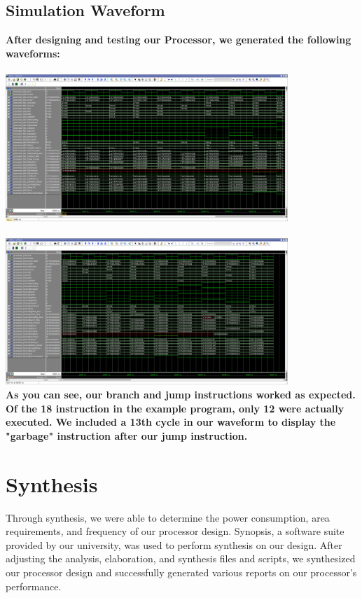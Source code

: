 \documentclass{article}
\begin{document}
\subsection{Simulation Waveform}
\bfseries{After designing and testing our Processor, we generated the following waveforms:} \\ \\
\includegraphics[width=0.8\textwidth]{waveform_part1.png} \\ \\
\includegraphics[width=0.8\textwidth]{waveform_part2.png} \\

As you can see, our branch and jump instructions worked as expected. Of the 18 instruction in the example program, only 12 were actually executed. We included a 13th cycle in our waveform to display the "garbage" instruction after our jump instruction.

\section{Synthesis}
Through synthesis, we were able to determine the power consumption, area requirements, and frequency of our processor design. Synopsis, a software suite provided by our university, was used to perform synthesis on our design. After adjusting the analysis, elaboration, and synthesis files and scripts, we synthesized our processor design and successfully generated various reports on our processor's performance.
\end{document}
